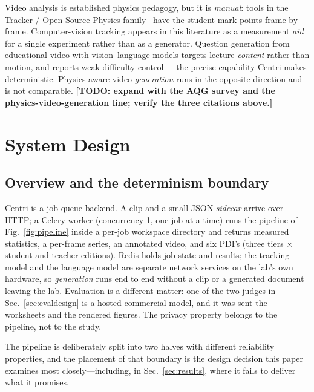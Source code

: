 \documentclass[conference]{IEEEtran}
\newcommand{\todo}[1]{{\color{red}\textbf{[TODO: #1]}}}
\begin{document}
Video analysis is established physics pedagogy, but it is \emph{manual}: tools
in the Tracker / Open Source Physics family~\cite{tracker} have the student
mark points frame by frame. Computer-vision tracking appears in this literature
as a measurement \emph{aid} for a single experiment rather than as a generator.
Question generation from educational video with vision--language models targets
lecture \emph{content} rather than motion, and reports weak difficulty
control~\cite{vlmqg}---the precise capability Centri makes
deterministic. Physics-aware video \emph{generation} runs in the opposite
direction and is not comparable. \todo{expand with the AQG survey and the
physics-video-generation line; verify the three citations above.}

\section{System Design}
\label{sec:system}

\subsection{Overview and the determinism boundary}

Centri is a job-queue backend. A clip and a small JSON \emph{sidecar} arrive
over HTTP; a Celery worker (concurrency 1, one job at a time) runs the pipeline
of Fig.~\ref{fig:pipeline} inside a per-job workspace directory and returns
measured statistics, a per-frame series, an annotated video, and six PDFs
(three tiers $\times$ student and teacher editions). Redis holds job state and
results; the tracking model and the language model are separate network
services on the lab's own hardware, so \emph{generation} runs end to end
without a clip or a generated document leaving the lab. Evaluation is a
different matter: one of the two judges in Sec.~\ref{sec:evaldesign} is a
hosted commercial model, and it was sent the worksheets and the rendered
figures. The privacy property belongs to the pipeline, not to the study.

The pipeline is deliberately split into two halves with different reliability
properties, and the placement of that boundary is the design decision this
paper examines most closely---including, in Sec.~\ref{sec:results}, where it
fails to deliver what it promises.
\end{document}
